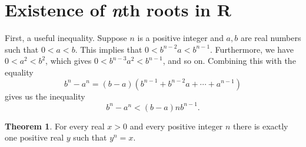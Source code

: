 \documentclass[12pt]{article}
\theoremstyle{definition}
\newtheorem{theorem}{Theorem}
\newcommand{\R}{\mathbf{R}}
\begin{document}
\section{Existence of \textit{n}th roots in \texorpdfstring{\(\R\)}{}}
\label{sec:existence_of_nth_roots_in_R}

First, a useful inequality. Suppose \( n \) is a positive integer and \( a, b \) are real numbers such that \( 0 < a < b \). This implies that \( 0 < b^{n-2}a < b^{n-1} \). Furthermore, we have \( 0 < a^2 < b^2 \), which gives \( 0 < b^{n-3}a^2 < b^{n-1} \), and so on. Combining this with the equality
\[
    b^n - a^n = (b - a)(b^{n-1} + b^{n-2}a + \cdots + a^{n-1})
\]
gives us the inequality
\[
    b^n - a^n < (b - a)nb^{n-1}. \tag{1}
\]

\begin{theorem}
\label{thm:existence_of_nth_roots_in_R}
    For every real \( x > 0 \) and every positive integer \( n \) there is exactly one positive real \( y \) such that \( y^n = x \).
\end{theorem}
\end{document}

